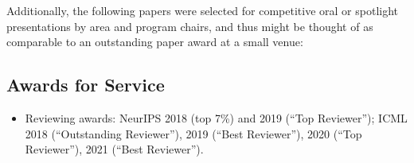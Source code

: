 \documentclass[10pt]{article}
\begin{document}
Additionally, the following papers were selected for competitive oral or spotlight presentations by area and program chairs,
and thus might be thought of as comparable to an outstanding paper award at a small venue:
\begin{itemize}[leftmargin=5em]
  
\end{itemize}

\subsection{Awards for Service} %
\begin{itemize}
  \item[] Reviewing awards: NeurIPS 2018 (top 7\%) and 2019 (``Top Reviewer''); ICML 2018 (``Outstanding Reviewer''), 2019 (``Best Reviewer''), 2020 (``Top Reviewer''), 2021 (``Best Reviewer'').
\end{itemize}

%

\end{document}

